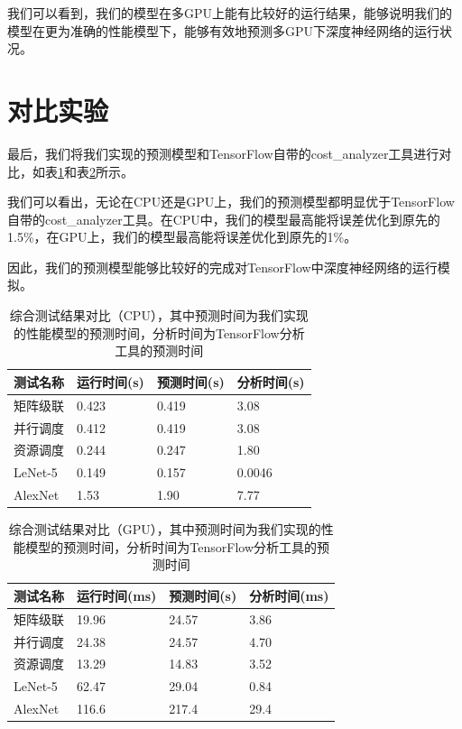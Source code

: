     我们可以看到，我们的模型在多GPU上能有比较好的运行结果，能够说明我们的模型在更为准确的性能模型下，能够有效地预测多GPU下深度神经网络的运行状况。
    
\section{对比实验}
    最后，我们将我们实现的预测模型和TensorFlow自带的cost\_analyzer工具进行对比，如表\ref{tab:cmp_cpu}和表\ref{tab:cmp_gpu}所示。
    
    我们可以看出，无论在CPU还是GPU上，我们的预测模型都明显优于TensorFlow自带的cost\_analyzer工具。在CPU中，我们的模型最高能将误差优化到原先的1.5\%，在GPU上，我们的模型最高能将误差优化到原先的1\%。
    
    因此，我们的预测模型能够比较好的完成对TensorFlow中深度神经网络的运行模拟。

    \begin{table}[!htbp]
        \centering
	    \caption{综合测试结果对比（CPU），其中预测时间为我们实现的性能模型的预测时间，分析时间为TensorFlow分析工具的预测时间}
        \label{tab:cmp_cpu}
        \begin{tabular}{|l|l|l|l|}
            \hline
            测试名称 & 运行时间(s) & 预测时间(s) & 分析时间(s)\\
            \hline
            矩阵级联 & 0.423 & 0.419 & 3.08 \\
            \hline
            并行调度 & 0.412 & 0.419 & 3.08 \\
            \hline
            资源调度 & 0.244 & 0.247 & 1.80 \\
            \hline
            LeNet-5 & 0.149 & 0.157 & 0.0046 \\
            \hline
            AlexNet & 1.53 & 1.90 & 7.77 \\
            \hline
        \end{tabular}
    \end{table}

    \begin{table}[!htbp]
        \centering
	    \caption{综合测试结果对比（GPU），其中预测时间为我们实现的性能模型的预测时间，分析时间为TensorFlow分析工具的预测时间}
        \label{tab:cmp_gpu}
        \begin{tabular}{|l|l|l|l|}
            \hline
            测试名称 & 运行时间(ms) & 预测时间(s) & 分析时间(ms)\\
            \hline
            矩阵级联 & 19.96 & 24.57 & 3.86 \\
            \hline
            并行调度 & 24.38 & 24.57 & 4.70 \\
            \hline
            资源调度 & 13.29 & 14.83 & 3.52 \\
            \hline
            LeNet-5 & 62.47 & 29.04 & 0.84 \\
            \hline
            AlexNet & 116.6 & 217.4 & 29.4 \\
            \hline
        \end{tabular}
    \end{table}